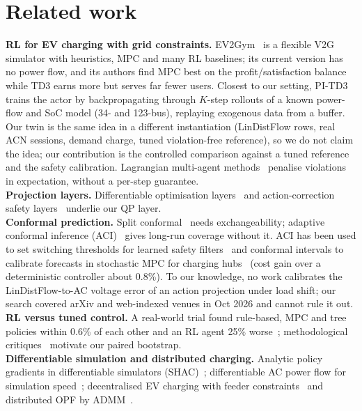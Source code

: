 \documentclass[10pt]{article}
\begin{document}
\section{Related work}
\textbf{RL for EV charging with grid constraints.} EV2Gym~\cite{ev2gym} is a flexible V2G simulator with heuristics, MPC and many RL baselines; its current version has no power flow, and its authors find MPC best on the profit/satisfaction balance while TD3 earns more but serves far fewer users. Closest to our setting, PI-TD3~\cite{pitd3} trains the actor by backpropagating through $K$-step rollouts of a known power-flow and SoC model (34- and 123-bus), replaying exogenous data from a buffer. Our twin is the same idea in a different instantiation (LinDistFlow rows, real ACN sessions, demand charge, tuned violation-free reference), so we do not claim the idea; our contribution is the controlled comparison against a tuned reference and the safety calibration. Lagrangian multi-agent methods~\cite{tlmappo} penalise violations in expectation, without a per-step guarantee.\\
\textbf{Projection layers.} Differentiable optimisation layers~\cite{optnet,cvxpylayers} and action-correction safety layers~\cite{dalal} underlie our QP layer.\\
\textbf{Conformal prediction.} Split conformal~\cite{vovk,lei} needs exchangeability; adaptive conformal inference (ACI)~\cite{aci} gives long-run coverage without it. ACI has been used to set switching thresholds for learned safety filters~\cite{acofi} and conformal intervals to calibrate forecasts in stochastic MPC for charging hubs~\cite{zapico} (cost gain over a deterministic controller about 0.8\%). To our knowledge, no work calibrates the LinDistFlow-to-AC voltage error of an action projection under load shift; our search covered arXiv and web-indexed venues in Oct 2026 and cannot rule it out.\\
\textbf{RL versus tuned control.} A real-world trial found rule-based, MPC and tree policies within 0.6\% of each other and an RL agent 25\% worse~\cite{ruddick}; methodological critiques~\cite{henderson,precipice} motivate our paired bootstrap.\\
\textbf{Differentiable simulation and distributed charging.} Analytic policy gradients in differentiable simulators (SHAC)~\cite{shac}; differentiable AC power flow for simulation speed~\cite{dpf}; decentralised EV charging with feeder constraints~\cite{distev} and distributed OPF by ADMM~\cite{boyd}.
\end{document}
